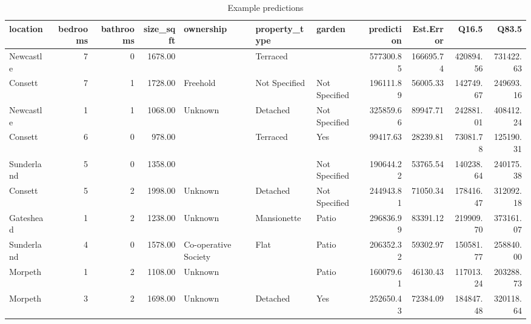 \begin{table}[ht]
\centering
\caption{Example predictions} 
\label{tab:pred}
\begin{tabular}{lrrrlllrrrr}
  \hline
location & bedrooms & bathrooms & size\_sqft & ownership & property\_type & garden & prediction & Est.Error & Q16.5 & Q83.5 \\ 
  \hline
Newcastle &   7 &   0 & 1678.00 &  & Terraced &  & 577300.85 & 166695.74 & 420894.56 & 731422.63 \\ 
  Consett &   7 &   1 & 1728.00 & Freehold & Not Specified & Not Specified & 196111.89 & 56005.33 & 142749.67 & 249693.16 \\ 
  Newcastle &   1 &   1 & 1068.00 & Unknown & Detached & Not Specified & 325859.66 & 89947.71 & 242881.01 & 408412.24 \\ 
  Consett &   6 &   0 & 978.00 &  & Terraced & Yes & 99417.63 & 28239.81 & 73081.78 & 125190.31 \\ 
  Sunderland &   5 &   0 & 1358.00 &  &  & Not Specified & 190644.22 & 53765.54 & 140238.64 & 240175.38 \\ 
  Consett &   5 &   2 & 1998.00 & Unknown & Detached & Not Specified & 244943.81 & 71050.34 & 178416.47 & 312092.18 \\ 
  Gateshead &   1 &   2 & 1238.00 & Unknown & Mansionette & Patio & 296836.99 & 83391.12 & 219909.70 & 373161.07 \\ 
  Sunderland &   4 &   0 & 1578.00 & Co-operative Society & Flat & Patio & 206352.32 & 59302.97 & 150581.77 & 258840.00 \\ 
  Morpeth &   1 &   2 & 1108.00 & Unknown &  & Patio & 160079.61 & 46130.43 & 117013.24 & 203288.73 \\ 
  Morpeth &   3 &   2 & 1698.00 & Unknown & Detached & Yes & 252650.43 & 72384.09 & 184847.48 & 320118.64 \\ 
   \hline
\end{tabular}
\end{table}

